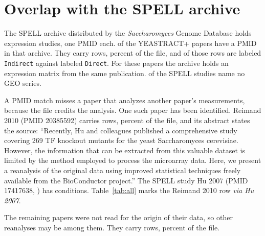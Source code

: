 
\section{Overlap with the SPELL archive}\label{sec:spell}

The SPELL archive distributed by the \emph{Saccharomyces} Genome Database holds
\ytNSpellStudies{} expression studies, one PMID each. \ytNSpellPapers{} of the \ytNPapers{}
YEASTRACT+ papers have a PMID in that archive. They carry \ytNSpellRows{} rows,
\ytPctSpellRows{} percent of the file, and \ytNSpellIndirectRows{} of those rows
are labeled \texttt{Indirect} against \ytNSpellDirectRows{} labeled
\texttt{Direct}. For these papers the archive holds an expression matrix from
the same publication. \ytNSpellNoGeo{} of the \ytNSpellPapers{} SPELL studies
name no GEO series.

A PMID match misses a paper that analyzes another paper's measurements, because
the file credits the analysis. One such paper has been identified. Reimand 2010
(PMID 20385592) carries \ytNReanalysisRows{} rows, \ytPctReanalysisRows{}
percent of the file, and its abstract states the source: ``Recently, Hu and
colleagues published a comprehensive study covering 269 TF knockout mutants for
the yeast Saccharomyces cerevisiae. However, the information that can be
extracted from this valuable dataset is limited by the method employed to
process the microarray data. Here, we present a reanalysis of the original data
using improved statistical techniques freely available from the BioConductor
project.'' The SPELL study Hu 2007 (PMID 17417638, \ytReanalysisSourceGeo{}) has
\ytReanalysisSourceConditions{} conditions.
Table~\ref{tab:all} marks the Reimand 2010 row \emph{via Hu 2007}.

The remaining \ytNAbsentPapers{} papers were not read for the origin of their
data, so other reanalyses may be among them. They carry \ytNAbsentRows{} rows,
\ytPctAbsentRows{} percent of the file.
